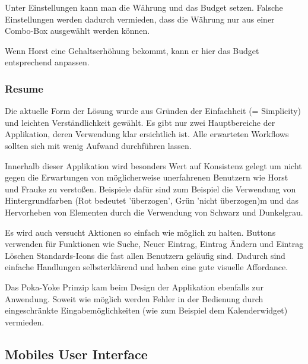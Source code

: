Unter Einstellungen kann man die W\"ahrung und das Budget setzen. Falsche
Einstellungen werden dadurch vermieden, dass die W\"ahrung nur aus einer
Combo-Box ausgew\"ahlt werden k\"onnen.

Wenn Horst eine Gehaltserh\"ohung bekommt, kann er hier das Budget entsprechend
anpassen.

\subsubsection{Resume}

Die aktuelle Form der L\"osung wurde aus Gründen der Einfachheit (= Simplicity) und leichten Verst\"andlichkeit gew\"ahlt.
Es gibt nur zwei Hauptbereiche der Applikation, deren Verwendung klar ersichtlich ist.
Alle erwarteten Workflows sollten sich mit wenig Aufwand durchf\"uhren lassen.

Innerhalb dieser Applikation wird besonders Wert auf Konsistenz gelegt um nicht gegen die Erwartungen
von m\"oglicherweise unerfahrenen Benutzern wie Horst und Frauke zu versto\ss en. Beispiele daf\"ur sind
zum Beispiel die Verwendung von Hintergrundfarben (Rot bedeutet '\"uberzogen', Gr\"un 'nicht \"uberzogen)m
und das Hervorheben von Elementen durch die Verwendung von Schwarz und Dunkelgrau.

Es wird auch versucht Aktionen so einfach wie m\"oglich zu halten. Buttons verwenden f\"ur Funktionen wie
Suche, Neuer Eintrag, Eintrag \"Andern und Eintrag L\"oschen Standards-Icons die fast allen Benutzern gel\"aufig sind.
Dadurch sind einfache Handlungen selbsterkl\"arend und haben eine gute visuelle Affordance.

Das Poka-Yoke Prinzip kam beim Design der Applikation ebenfalls zur Anwendung. Soweit
wie m\"oglich werden Fehler in der Bedienung durch eingeschr\"ankte Eingabem\"oglichkeiten (wie zum Beispiel dem
Kalenderwidget) vermieden.

\subsection{Mobiles User Interface}

